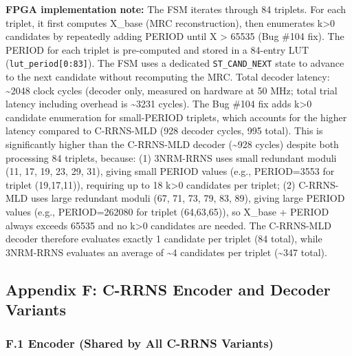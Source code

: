 \textbf{FPGA implementation note:} The FSM iterates through 84 triplets.
For each triplet, it first computes X\_base (MRC reconstruction), then
enumerates k\textgreater0 candidates by repeatedly adding PERIOD until X
\textgreater{} 65535 (Bug \#104 fix). The PERIOD for each triplet is
pre-computed and stored in a 84-entry LUT
(\texttt{lut\_period{[}0:83{]}}). The FSM uses a dedicated
\texttt{ST\_CAND\_NEXT} state to advance to the next candidate without
recomputing the MRC. Total decoder latency: \textasciitilde2048 clock
cycles (decoder only, measured on hardware at 50 MHz; total trial
latency including overhead is \textasciitilde3231 cycles). The Bug \#104
fix adds k\textgreater0 candidate enumeration for small-PERIOD triplets,
which accounts for the higher latency compared to C-RRNS-MLD (928
decoder cycles, 995 total). This is significantly higher than the
C-RRNS-MLD decoder (\textasciitilde928 cycles) despite both processing
84 triplets, because: (1) 3NRM-RRNS uses small redundant moduli (11, 17,
19, 23, 29, 31), giving small PERIOD values (e.g., PERIOD=3553 for
triplet (19,17,11)), requiring up to 18 k\textgreater0 candidates per
triplet; (2) C-RRNS-MLD uses large redundant moduli (67, 71, 73, 79, 83,
89), giving large PERIOD values (e.g., PERIOD=262080 for triplet
(64,63,65)), so X\_base + PERIOD always exceeds 65535 and no
k\textgreater0 candidates are needed. The C-RRNS-MLD decoder therefore
evaluates exactly 1 candidate per triplet (84 total), while 3NRM-RRNS
evaluates an average of \textasciitilde4 candidates per triplet
(\textasciitilde347 total).

\subsection{Appendix F: C-RRNS Encoder and Decoder
Variants}\label{appendix-f-c-rrns-encoder-and-decoder-variants}

\subsubsection{F.1 Encoder (Shared by All C-RRNS
Variants)}\label{f.1-encoder-shared-by-all-c-rrns-variants}

